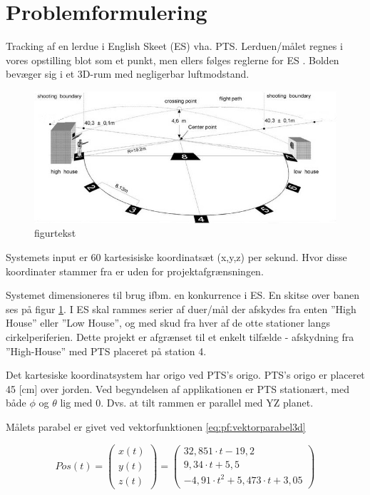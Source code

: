 \section{Problemformulering}
Tracking af en lerdue i English Skeet (ES) vha. PTS. 
Lerduen/målet regnes i vores opstilling blot som et punkt, men ellers følges reglerne for ES \citep{ES_regler}.
Bolden bevæger sig i et 3D-rum med negligerbar luftmodstand. 

\begin{figure}[th!]
\centering
\includegraphics[width=1\textwidth]{./graphics/skeet_diagram_cropped}
\caption[tekst i indholdsfortegnelsen]{figurtekst}
\label{fig:ES}
\end{figure}	
Systemets input er 60 kartesisiske koordinatsæt (x,y,z) per sekund. Hvor disse 
koordinater stammer fra er uden for projektafgrænsningen. 

Systemet dimensioneres til brug ifbm. en konkurrence i ES. En skitse over 
banen ses på figur \ref{fig:ES}. 
I ES skal rammes serier af duer/mål der afskydes fra 
enten ”High House” eller ”Low House”, og med skud fra hver af de otte stationer langs 
cirkelperiferien. Dette projekt er afgrænset til et enkelt tilfælde - afskydning fra ”High-House” med PTS placeret på station 4. 

Det kartesiske koordinatsystem har origo ved PTS's origo. PTS's origo er placeret 45 [cm] over jorden. Ved begyndelsen af applikationen er PTS stationært, med både $\phi$ og $\theta$ lig med 0. Dvs. at tilt rammen er parallel med YZ planet. 

Målets parabel er givet ved vektorfunktionen \ref{eq:pf:vektorparabel3d}

\begin{equation}
Pos\left( t \right) = 
\left( \begin{matrix} 
	x\left( t \right)  \\ 
	y\left( t \right)  \\ 
	z\left( t \right)  \end{matrix} \right) =	\left( \begin{matrix}
	32,851\cdot t-19,2 \\
	9,34\cdot t+5,5 \\
	-{ 4,91\cdot t }^{ 2 }+5,473\cdot t+3,05 
 \end{matrix} \right) 
\label{eq:pf:vektorparabel3d}
\end{equation}

